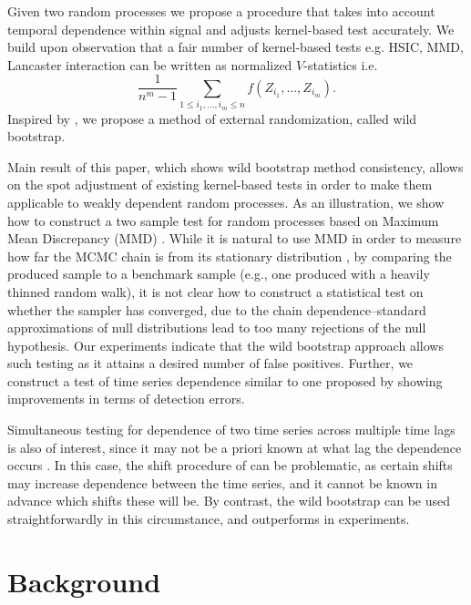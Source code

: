 \documentclass{article} %
\begin{document}
Given two random processes we propose a procedure that takes into account temporal dependence within signal and adjusts kernel-based test accurately. We build upon observation that a fair number of kernel-based tests e.g. HSIC, MMD, Lancaster interaction can be written as normalized $V$-statistics i.e. 
\[
\frac{1} {n^m-1} \sum_{1\leq i_1,...,i_m \leq n} f(Z_{i_1},...,Z_{i_m}).
\]
Inspired by \cite{leucht_dependent_2013},\cite{BerTho04} we propose a method of external randomization, called wild bootstrap.                     

Main result of this paper, which shows wild bootstrap method consistency, allows on the spot adjustment of existing kernel-based tests in order to make them applicable to weakly dependent random processes. As an illustration, we show how to construct a two sample test for random processes based on Maximum Mean Discrepancy (MMD) \cite{gretton2012kernel}. 
While it is natural to use MMD in order to measure how far the MCMC chain is from its stationary distribution \cite[Section 5]{sejdinovic_KAMH}, 
by comparing the produced sample to a benchmark sample (e.g., one produced with a heavily thinned random walk), it is not clear how to construct a statistical test on whether the sampler has converged, due to the chain dependence--standard approximations of null distributions lead to too many rejections of the null hypothesis.
Our experiments indicate that the wild bootstrap approach allows such testing as it attains a desired number of false positives.  
Further, we construct a test of time series dependence similar to one proposed by \cite{besserve_statistical_2013} showing improvements in terms of detection errors.            

Simultaneous testing for dependence of two time series across multiple time lags is also of interest, since it may not be a priori known at what lag the dependence occurs \cite{besserve_statistical_2013}. In this case, the shift procedure of \cite{chwialkowski2014kernel} can be problematic, as certain shifts may increase dependence between the time series, and it cannot be known in advance which shifts these will be. By contrast, the wild bootstrap can be used straightforwardly in this circumstance, and outperforms \cite{besserve_statistical_2013} in experiments.

\section{Background}\label{sec:background}
\end{document}

